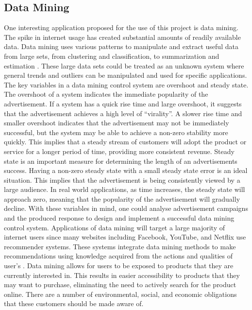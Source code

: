 \documentclass[12pt,letterpaper]{article}
\begin{document}
\subsection{Data Mining}
One interesting application proposed for the use of this project is data mining. The spike in internet usage has created substantial amounts of readily available data. Data mining uses various patterns to manipulate and extract useful data from large sets, from clustering and classification, to summarization and estimation \cite{data mining 1}. These large data sets could be treated as an unknown system where general trends and outliers can be manipulated and used for specific applications. 
The key variables in a data mining control system are overshoot and steady state. The overshoot of a system indicates the immediate popularity of the advertisement.  If a system has a quick rise time and large overshoot, it suggests that the advertisement achieves a high level of “virality”. A slower rise time and smaller overshoot indicates that the advertisement may not be immediately successful, but the system may be able to achieve a non-zero stability more quickly. This implies that a steady stream of customers will adopt the product or service for a longer period of time, providing more consistent revenue. Steady state is an important measure for determining the length of an advertisements success. Having a non-zero steady state with a small steady state error is an ideal situation. This implies that the advertisement is being consistently viewed by a large audience. In real world applications, as time increases, the steady state will approach zero, meaning that the popularity of the advertisement will gradually decline. With these variables in mind, one could analyse advertisement campaigns and the produced response to design and implement a successful data mining control system.
Applications of data mining will target a large majority of internet users since many websites including Facebook, YouTube, and Netflix use recommender systems. These systems integrate data mining methods to make recommendations using knowledge acquired from the actions and qualities of user’s \cite{data mining 2}. Data mining allows for users to be exposed to products that they are currently interested in.  This results in easier accessibility to products that they may want to purchase, eliminating the need to actively search for the product online. 
There are a number of environmental, social, and economic obligations that these customers should be made aware of. 
\end{document}
